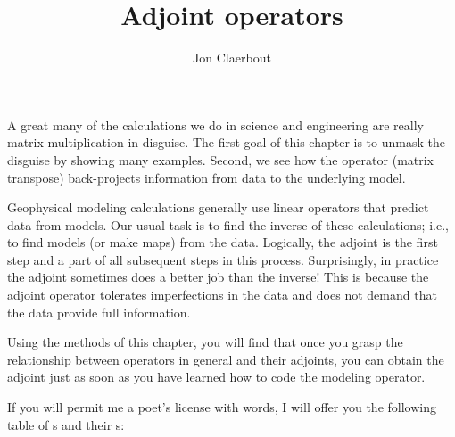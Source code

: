 \def\CAKEDIR{.}

\title{Adjoint operators}
\author{Jon Claerbout}
\label{paper:conj}
\maketitle

A great many of the calculations
we do in science and engineering
are really matrix multiplication in disguise.
The first goal of this chapter is to unmask the disguise
by showing many examples.
Second, we see how the 
 operator (matrix transpose)
back-projects information from data to the underlying model.

\par
Geophysical modeling calculations
generally use linear operators that predict data from models.
Our usual task is to find the inverse of these calculations;
i.e., to find models (or make maps) from the data.
Logically, the adjoint is the first step
and a part of all subsequent steps in this  process.
Surprisingly, in practice the adjoint sometimes does a better job
than the inverse!
This is because the adjoint operator tolerates imperfections
in the data and does not demand that the data provide full information.

\par
Using the methods of this chapter,
you will find that
once you grasp the relationship between operators in general
and their adjoints,
you can obtain the adjoint just
as soon as you have learned how to code
the modeling operator.

\par
If you will permit me a poet's license with words,
I will offer you the following table
of s and their s:

